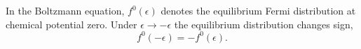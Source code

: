\documentclass{article}
\begin{document}
In the Boltzmann equation, $f^{0}(\epsilon)$ denotes the equilibrium Fermi distribution at chemical
potential zero. Under $\epsilon \to -\epsilon$ the equilibrium distribution changes sign,
\begin{equation}
f^{0}(-\epsilon) = -f^{0}(\epsilon) .
\label{eq:odd}
\end{equation}
\end{document}
